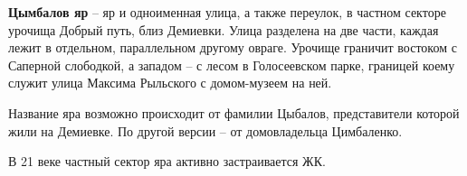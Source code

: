 \medskip

\textbf{Цымбалов яр} – яр и одноименная улица, а также переулок, в частном секторе урочища Добрый путь, близ Демиевки. Улица разделена на две части, каждая лежит в отдельном, параллельном другому овраге. Урочище граничит востоком с Саперной слободкой, а западом – с лесом в Голосеевском парке, границей коему служит улица Максима Рыльского с домом-музеем на ней.

Название яра возможно происходит от фамилии Цыбалов, представители которой жили на Демиевке. По другой версии – от домовладельца Цимбаленко.

В 21 веке частный сектор яра активно застраивается ЖК.


